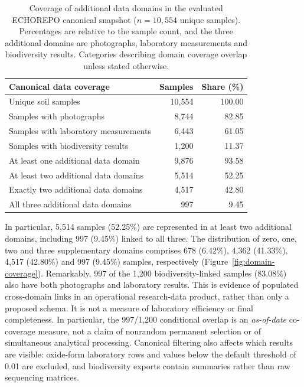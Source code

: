 \documentclass[11pt,a4paper]{article}
\begin{document}
\begin{table}[htbp]
\centering\small
\caption{Coverage of additional data domains in the evaluated ECHOREPO canonical snapshot ($n=10{,}554$ unique samples). Percentages are relative to the sample count, and the three additional domains are photographs, laboratory measurements and biodiversity results. Categories describing domain coverage overlap unless stated otherwise.}
\label{tab:coverage}
\begin{tabularx}{\linewidth}{@{}Xrr@{}}
\toprule
Canonical data coverage & Samples & Share (\%) \\
\midrule
Unique soil samples & 10,554 & 100.00 \\
Samples with photographs & 8,744 & 82.85 \\
Samples with laboratory measurements & 6,443 & 61.05 \\
Samples with biodiversity results & 1,200 & 11.37 \\
\midrule
At least one additional data domain & 9,876 & 93.58 \\
At least two additional data domains & 5,514 & 52.25 \\
Exactly two additional data domains & 4,517 & 42.80 \\
All three additional data domains & 997 & 9.45 \\
\bottomrule
\end{tabularx}
\end{table}

In particular, 5,514 samples (52.25\%) are represented in at least two additional domains, including 997 (9.45\%) linked to all three. The distribution of zero, one, two and three supplementary domains comprises 678 (6.42\%), 4,362 (41.33\%), 4,517 (42.80\%) and 997 (9.45\%) samples, respectively (Figure~\ref{fig:domain-coverage}). Remarkably, 997 of the 1,200 biodiversity-linked samples (83.08\%) also have both photographs and laboratory results. This is evidence of populated cross-domain links in an operational research-data product, rather than only a proposed schema. It is not a measure of laboratory efficiency or final completeness. In particular, the 997/1,200 conditional overlap is an \emph{as-of-date} co-coverage measure, not a claim of nonrandom permanent selection or of simultaneous analytical processing. Canonical filtering also affects which results are visible: oxide-form laboratory rows and values below the default threshold of 0.01 are excluded, and biodiversity exports contain summaries rather than raw sequencing matrices.
\end{document}
